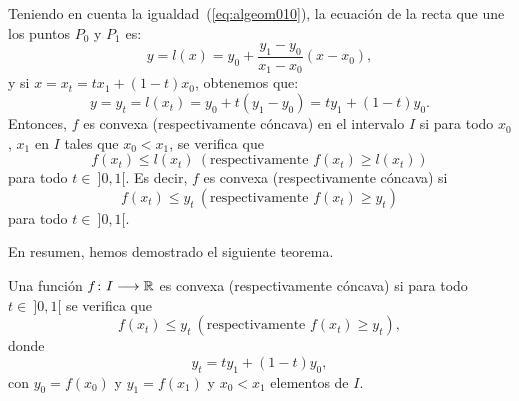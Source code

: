 Teniendo en cuenta la igualdad~(\ref{eq:algeom010}), la ecuación de la recta que une los puntos
$P_{0}$ y $P_{1}$ es:
\begin{equation}
\label{eq:algeom013}
y = l(x)= y_{0}+ \frac{y_{1}-y_{0}}{x_{1}-x_{0}} (x-x_{0}),
\end{equation}
y si $x= x_{t} = tx_{1}+(1-t)x_{0}$, obtenemos que:
\begin{equation}
\label{eq:algeom014}
y = y_{t}=l(x_{t})= y_{0} + t(y_1 - y_0) = ty_{1}+(1-t)y_{0}.
\end{equation}
Entonces, $f$ es convexa (respectivamente cóncava) en el intervalo $I$ si para todo $x_{0}$,
$x_{1}$ en $I$ tales que $x_{0}<x_{1}$, se verifica que
\begin{equation}
\label{eq:algeom015}
f(x_{t})\leq l(x_{t}) \ (\text{respectivamente } f(x_{t})\geq l(x_{t}))
\end{equation}
para todo $t\in\ ]0,1[$. Es decir, $f$ es convexa (respectivamente cóncava) si
\begin{equation}
\label{eq:algeom016}
f(x_{t})\leq y_{t} \ (\text{respectivamente } f(x_{t})\geq y_{t})
\end{equation}
para todo $t\in\ ]0,1[$.

En resumen, hemos demostrado el siguiente teorema.

\begin{teocal}\label{teo:daCaracterizacionConvexidad}
Una función $f\colon I\longrightarrow \mathbb{R}$ es convexa (respectivamente cóncava) si para todo $t \in\ ]0,1[$
se verifica que
\[
f(x_t) \leq y_t \ (\text{respectivamente } f(x_t) \geq y_t),
\]
donde
\[
y_t = ty_1 + (1 - t)y_0,
\]
con $y_0 = f(x_0)$ y $y_1 = f(x_1)$ y $x_0 < x_1$ elementos de $I$.
\end{teocal}

